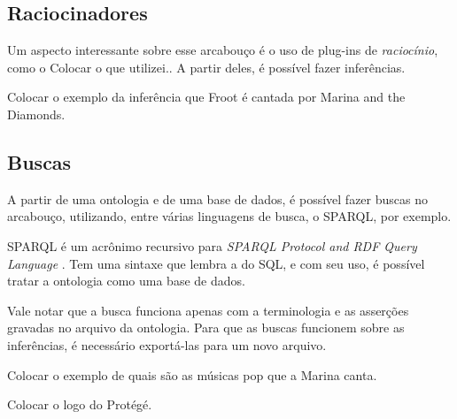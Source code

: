 \subsection{Raciocinadores}

Um aspecto interessante sobre esse arcabouço é o uso de plug-ins de \textit{raciocínio}, como o {\color{red} Colocar o que utilizei.}. A partir deles, é possível fazer inferências. 

{\color{red} Colocar o exemplo da inferência que Froot é cantada por Marina and the Diamonds.}

\subsection{Buscas}

A partir de uma ontologia e de uma base de dados, é possível fazer buscas no arcabouço, utilizando, entre várias linguagens de busca, o SPARQL, por exemplo.

SPARQL é um acrônimo recursivo para \textit{SPARQL Protocol and RDF Query Language} \cite{ferramentasSPARQL}. Tem uma sintaxe que lembra a do SQL, e com seu uso, é possível tratar a ontologia como uma base de dados.  

Vale notar que a busca funciona apenas com a terminologia e as asserções gravadas no arquivo da ontologia. Para que as buscas funcionem sobre as inferências, é necessário exportá-las para um novo arquivo.

{\color{red} Colocar o exemplo de quais são as músicas pop que a Marina canta.}

{\color{red} Colocar o logo do Protégé.}